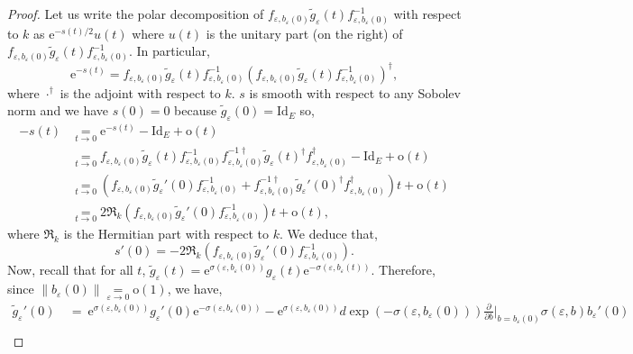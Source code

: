 \documentclass{article}
\theoremstyle{remark}
\theoremstyle{definition}
\newcommand{\landau}[2]{\underset{#1 \rightarrow #2}{=}}
\newcommand{\Id}{\mathrm{Id}}
\newcommand{\e}{\boldsymbol{\mathrm{e}}}
\newcommand{\norme}[1]{\left\| #1 \right\|}
\begin{document}
\begin{proof}
Let us write the polar decomposition of $f_{\varepsilon,b_\varepsilon(0)}\tilde{g}_\varepsilon(t)f_{\varepsilon,b_\varepsilon(0)}^{-1}$ with respect to $k$ as $\e^{-s(t)/2}u(t)$ where $u(t)$ is the unitary part (on the right) of $f_{\varepsilon,b_\varepsilon(0)}\tilde{g}_\varepsilon(t)f_{\varepsilon,b_\varepsilon(0)}^{-1}$. In particular,
$$
\e^{-s(t)} = f_{\varepsilon,b_\varepsilon(0)}\tilde{g}_\varepsilon(t)f_{\varepsilon,b_\varepsilon(0)}^{-1}(f_{\varepsilon,b_\varepsilon(0)}\tilde{g}_\varepsilon(t)f_{\varepsilon,b_\varepsilon(0)}^{-1})^\dagger,
$$
where $\cdot^\dagger$ is the adjoint with respect to $k$. $s$ is smooth with respect to any Sobolev norm and we have $s(0) = 0$ because $\tilde{g}_\varepsilon(0) = \Id_E$ so,
\begin{align*}
    -s(t) & \landau{t}{0} \e^{-s(t)} - \Id_E + \mathrm{o}(t)\\
    & \landau{t}{0} f_{\varepsilon,b_\varepsilon(0)}\tilde{g}_\varepsilon(t)f_{\varepsilon,b_\varepsilon(0)}^{-1}f_{\varepsilon,b_\varepsilon(0)}^{-1\dagger}\tilde{g}_\varepsilon(t)^\dagger f_{\varepsilon,b_\varepsilon(0)}^\dagger - \Id_E + \mathrm{o}(t)\\
    & \landau{t}{0} (f_{\varepsilon,b_\varepsilon(0)}\tilde{g}_\varepsilon'(0)f_{\varepsilon,b_\varepsilon(0)}^{-1} + f_{\varepsilon,b_\varepsilon(0)}^{-1\dagger}\tilde{g}_\varepsilon'(0)^\dagger f_{\varepsilon,b_\varepsilon(0)}^\dagger)t + \mathrm{o}(t)\\
    & \landau{t}{0} 2\Re_k(f_{\varepsilon,b_\varepsilon(0)}\tilde{g}_\varepsilon'(0)f_{\varepsilon,b_\varepsilon(0)}^{-1})t + \mathrm{o}(t),
\end{align*}
where $\Re_k$ is the Hermitian part with respect to $k$. We deduce that,
\begin{equation}\label{EQ:s'(0)}
    s'(0) = -2\Re_k(f_{\varepsilon,b_\varepsilon(0)}\tilde{g}_\varepsilon'(0)f_{\varepsilon,b_\varepsilon(0)}^{-1}).
\end{equation}
Now, recall that for all $t$, $\tilde{g}_\varepsilon(t) = \e^{\sigma(\varepsilon,b_\varepsilon(0))}g_\varepsilon(t)\e^{-\sigma(\varepsilon,b_\varepsilon(t))}$. Therefore, since $\norme{b_\varepsilon(0)} \landau{\varepsilon}{0} \mathrm{o}(1)$, we have,
\begin{align*}
    \tilde{g}_\varepsilon'(0) & \ =\ \e^{\sigma(\varepsilon,b_\varepsilon(0))}g_\varepsilon'(0)\e^{-\sigma(\varepsilon,b_\varepsilon(0))} - \e^{\sigma(\varepsilon,b_\varepsilon(0))}d\exp(-\sigma(\varepsilon,b_\varepsilon(0)))\frac{\partial}{\partial b}|_{b = b_\varepsilon(0)}\sigma(\varepsilon,b)b_\varepsilon'(0)\\

\end{align*}
\end{proof}
\end{document}
